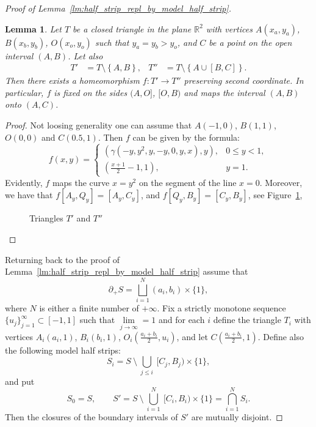 \documentclass[12pt, reqno]{amsart}
\newcommand{\sublemmaname}{Lemma}%
\newtheorem{sublemma}[subsubsection]{\protect\sublemmaname}
\newcommand{\bR}{\mathbb{R}}
\newcommand{\strip}{S}
\newcommand{\leveld}[1]{u_{#1}}
\begin{document}
\begin{proof}[Proof of Lemma~\ref{lm:half_strip_repl_by_model_half_strip}]
\begin{sublemma}\label{lm:triangles}
Let  $T$ be a closed triangle in the plane $\bR^2$ with vertices $A(x_a, y_a)$, $B(x_b,y_b)$, $O(x_o,y_o)$ such that $y_a=y_b>y_o$, and  $C$ be a point on the open interval $(A,B)$.
Let also 
\begin{align*}
 T'&=T\setminus \left\lbrace A,B\right\rbrace, & 
 T''& =T \setminus \left\lbrace A \cup [B,C] \right\rbrace.
\end{align*}
Then there exists a homeomorphism $f: T' \rightarrow T''$ preserving second coordinate.
In particular, $f$ is fixed on the sides $(A,O]$, $[O,B)$ and maps the interval $(A,B)$ onto $(A,C)$.
\end{sublemma}
\begin{proof}
Not loosing generality one can assume that 
$A(-1,0)$, $B(1,1)$, $O(0,0)$ and $C(0.5,1)$.
Then $f$ can be given by the formula:
\[
f(x,y)=
\begin{cases}
\left( \gamma(-y,y^2,y,-y,0,y,x), y\right), & 0 \leqslant y <1,\\
\left(\frac{x+1}{2}-1,1 \right), & y=1. 
\end{cases}
\]
Evidently, $f$ maps the curve $x=y^2$ on the segment of the line $x=0$.
Moreover, we have that $f[A_y, Q_y] = [A_y, C_y]$, and $f[Q_y,B_y]=[C_y, B_y]$, see %
Figure~\ref{fig:triangles},
\begin{figure}[h]
\caption{Triangles $T'$ and $T''$}
\label{fig:triangles}
\end{figure}
\end{proof}


Returning back to the proof of Lemma~\ref{lm:half_strip_repl_by_model_half_strip} assume that 
\[ \partial_{+} \strip = \bigsqcup\limits_{i=1}^{N} (a_i, b_i) \times \{1\},\]
where $N$ is either a finite number of $+\infty$.
Fix a strictly monotone sequence $\{\leveld{j}\}^{\infty}_{j=1} \subset [-1,1]$ such that $\lim\limits_{j \to \infty} = 1$ and for each $i$ define the triangle $T_i$ with vertices $A_i(a_i,1)$, $B_i(b_i,1)$, $O_i(\frac{a_i+b_i}{2},u_i)$, and let $C(\frac{a_i+b_i}{2},1)$.
Define also the following model half strips:
\[
\strip_i = \strip \ \setminus \ \bigcup_{j\leq i} \ [C_j,B_j) \times \{1\}, 
\]
and put
\[\strip_0 = \strip, \qquad 
\strip' = \strip \ \setminus \ \bigcup_{i=1}^{N} \ [C_i,B_i) \times \{1\} = \bigcap_{i=1}^{N} \strip_i. \]
Then the closures of the boundary intervals of $\strip'$ are mutually disjoint.


\end{proof}
\end{document}
